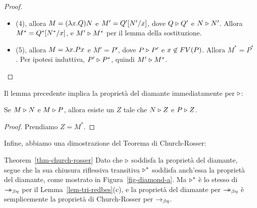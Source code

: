 \documentclass{article}
\begin{document}
\begin{proof}
\begin{itemize}
\begin{itemize}
      $N\tri N'$:
      \begin{itemize}
      \item (2), allora $N' = P'x$, dove $P\tri
        P'$. Per ipotesi induttiva $P' \tri P^*$.  Quindi $M' = \lam
        x.P'x \tri P^* = M^*$ prt (5).
      \item (4), allora $P = \lam y.Q$ e $N' =
        \subst{Q'}{x}{y}$, dove $Q\tri Q'$. Allora $M' = \lam
        x.\subst{Q'}{x}{y} = \lam y.Q'$ (nota $x \not\in \FV{Q'}$).
        Ma $P \tri \lam y.Q'$, quindi per ipotesi induttiva, $\lam
        y.Q' \tri P^* = M^*$.
      \end{itemize}
    \end{itemize}
  \item (4), allora $M = (\lambda x.Q)N$ e $M' =
    Q'[N'/x]$, dove $Q\tri Q'$ e $N\tri N'$. Allora $M^* =
    Q^*[N^*/x]$, e $M' \mathrel{\triangleright} M^*$ per il lemma della sostituzione.
  \item (5), allora $M = \lambda x.Px$ e $M' = P'$,
    dove $P\tri P'$ e $x\not\in FV(P)$. Allora $M^*=P^*$. Per
    ipotesi induttiva, $P'\tri P^*$, quindi $M'\mathrel{\triangleright} M^*$.  \eot
  \end{itemize}
\end{proof}

Il lemma precedente implica la propriet\`a del diamante immediatamente per
$\mathrel{\triangleright}$:

\begin{lemma}
  Se $M\mathrel{\triangleright} N$ e $M\mathrel{\triangleright} P$, allora esiste un $Z$ tale che $N\mathrel{\triangleright}
  Z$ e $P\mathrel{\triangleright} Z$. 
\end{lemma}

\begin{proof}
  Prendiamo $Z=M^*$.\eot
\end{proof}

Infine, abbiamo una dimostrazione del Teorema di Church-Rosser:

\begin{proofof}{Theorem~\ref{thm-church-rosser}}
  Dato che $\mathrel{\triangleright}$ soddisfa la propriet\`a del diamante, segue che la sua
  chiusura riflessiva transitiva $\mathrel{\triangleright}^*$ soddisfa anch'essa la propriet\`a
  del diamante, come mostrato in Figura~\ref{fig-diamond-a}. Ma $\mathrel{\triangleright}^*$ \`e lo stesso
  di $\mathrel{\rightarrow\!\!\!\!\!\rightarrow}_{\beta\eta}$ per il Lemma~\ref{lem-tri-redbes}(c), e la propriet\`a del diamante per
  $\mathrel{\rightarrow\!\!\!\!\!\rightarrow}_{\beta\eta}$ \`e semplicemente la propriet\`a di Church-Rosser per $\rightarrow_{\beta\eta}$.\eot
\end{proofof}

\end{document}
